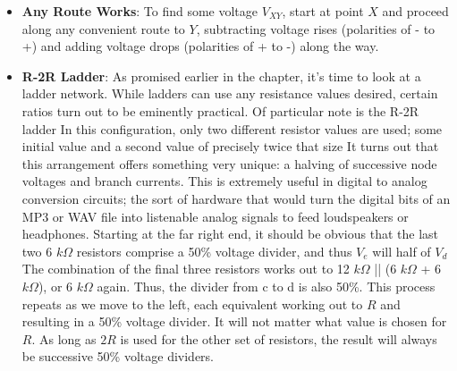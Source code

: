 \documentclass{report}
\begin{document}
\begin{itemize}
\[            \]
            Surely, it is a tad tedious to compute the value, but it is not
            particularly difficult. A word to the wise: if the goal is to determine
            the voltages at the various nodes or the myriad branch currents, it will
            be helpful to keep track of the equivalent resistances of the various
            groupings.
            \bigbreak \noindent 
            For example, if \(V_{cf}\) is known and the goal is to find \(V_{df}\),
            the voltage-divider relationship would be
            \[
                V_{df}
                =
                V_{cf}
                \frac{R_6 \parallel (R_7 + R_8)}
                {R_5 + \bigl(R_6 \parallel (R_7 + R_8)\bigr)}.
            \]
            Note that || has higher precedence than + or -, therefore || is performed first, rather like multiplication when mixed with addition and subtraction.
        \item \textbf{Any Route Works}: To find some voltage $V_{XY}$, start at point $X$ and proceed along any convenient route to $Y$, subtracting voltage rises (polarities of - to +) and adding voltage drops (polarities of + to -) along the way.
        \item \textbf{R-2R Ladder}: As promised earlier in the chapter, it's time to look at a ladder network. While ladders can use any resistance values desired, certain ratios turn out to be eminently practical. Of particular note is the R-2R ladder
            \bigbreak \noindent 
            In this configuration, only two different resistor values are used; some initial value and a second value of precisely twice that size
            \bigbreak \noindent 
            \bigbreak \noindent 
            It turns out that this arrangement offers something very unique: a halving of successive node voltages and branch currents. This is extremely useful in digital to analog conversion circuits; the sort of hardware that would turn the digital bits of an MP3 or WAV file into listenable analog signals to feed loudspeakers or headphones.
            \bigbreak \noindent 
            Starting at the far right end, it should be obvious that the last two 6 $k \Omega$ resistors comprise a 50\% voltage divider, and thus $V_{e}$ will half of $V_{d}$ 
            \bigbreak \noindent 
            The combination of the final three resistors works out to 12 $k \Omega$ || (6 $k \Omega$ + 6 $k \Omega $), or 6 $k \Omega$ again. Thus, the divider from c to d is also 50\%. This process repeats as we move to the left, each equivalent working out to $R$ and resulting in a 50\% voltage divider. It will not matter what value is chosen for $R$. As long as $2R$ is used for the other set of resistors, the result will always be successive 50\% voltage dividers.

\end{itemize}
\end{document}
